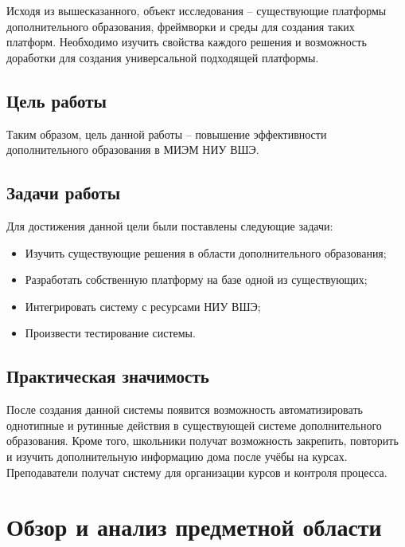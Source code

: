 \documentclass[a4paper,14pt]{article}
\begin{document}
Исходя из вышесказанного, объект исследования -- существующие платформы дополнительного образования, фреймворки и среды для создания таких платформ.
Необходимо изучить свойства каждого решения и возможность доработки для создания универсальной подходящей платформы.


\subsection{Цель работы}
Таким образом, цель данной работы -- повышение эффективности дополнительного образования в МИЭМ НИУ ВШЭ.

\subsection{Задачи работы}
Для достижения данной цели были поставлены следующие задачи:
\begin{itemize}
	\item Изучить существующие решения в области дополнительного образования;
	\item Разработать собственную платформу на базе одной из существующих;
	\item Интегрировать систему с ресурсами НИУ ВШЭ;
	\item Произвести тестирование системы.
\end{itemize}

\subsection{Практическая значимость}
После создания данной системы появится возможность автоматизировать однотипные и рутинные действия в существующей системе дополнительного образования.
Кроме того, школьники получат возможность закрепить, повторить и изучить дополнительную информацию дома после учёбы на курсах.
Преподаватели получат систему для организации курсов и контроля процесса.



\pagebreak


\section{Обзор и анализ предметной области}
\end{document}
